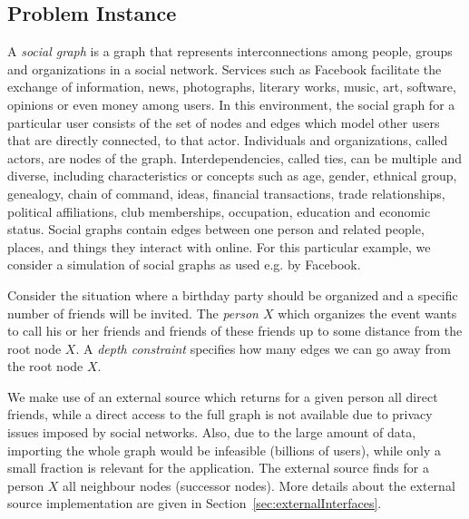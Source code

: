 \documentclass[a4paper, titlepage]{article}
\begin{document}
\subsection{Problem Instance}
A \emph{social graph} is a graph that represents 
interconnections among people, groups 
and organizations in a social network. Services such as 
Facebook facilitate the exchange 
of information, news, photographs, literary works, music, 
art, software, opinions or even 
money among users. In this environment, the social graph 
for a particular user consists 
of the set of nodes and edges which model other users that 
are directly connected, to that actor. 
Individuals and organizations, called actors, are nodes of 
the graph. Interdependencies, 
called ties, can be multiple and diverse, including 
characteristics or concepts such as age, 
gender, ethnical group, genealogy, chain of command, ideas, financial 
transactions, trade relationships, 
political affiliations, club memberships, occupation, 
education and economic status. 
Social graphs contain edges between one person and related 
people, places, and things they interact 
with online. For this particular example, we consider a 
simulation of social graphs as used e.g. by Facebook. 

Consider the situation where a birthday party should be 
organized and a specific number of friends will be invited. 
The \emph{person $X$} which organizes the event wants to 
call his or her friends and friends of these friends up to 
some distance from the root node $X$. A \emph{depth 
constraint} specifies how many edges we can go away from 
the root node $X$.
 

We make use of an external source which returns for a given 
person all direct friends, while a direct access to the 
full graph is not available due to privacy issues imposed 
by social networks. Also, due to the large amount of data, 
importing the whole graph would be infeasible (billions of 
users), while only a small fraction is relevant for the 
application. The external source finds for a person $X$ all 
neighbour nodes (successor nodes). More details about the 
external source implementation are given in 
Section~\ref{sec:externalInterfaces}. 
               
\end{document}
